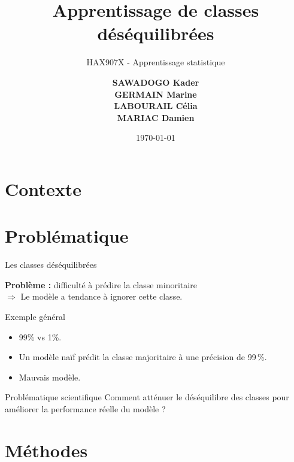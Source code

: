 \documentclass{beamer}
\title[Apprentissage de classes déséquilibrées]{\textbf{Apprentissage de classes déséquilibrées}}
\subtitle{\LARGE HAX907X - Apprentissage statistique}
\author[]{\textbf{SAWADOGO Kader \\ GERMAIN Marine \\ LABOURAIL Célia \\ MARIAC Damien}}
\institute[Université Montpellier]{Université Montpellier \\ Département de Mathématique}
\date{\today}
\begin{document}
\begin{frame}
  \titlepage
\end{frame}
\section{Contexte}

\section{Problématique}

\begin{frame}{Les classes déséquilibrées}

    \textbf{Problème :} difficulté à prédire la classe minoritaire \\[0.3cm]
    $\Rightarrow$ Le modèle a tendance à ignorer cette classe. \\[0.5cm]

    \begin{block}{Exemple général}
        \begin{itemize}
            \item 99\% vs 1\%.
            \item Un modèle naïf prédit la classe majoritaire à une précision de 99\,\%.
            \item Mauvais modèle.
        \end{itemize}
    \end{block}

\end{frame}


\begin{frame}{Problématique scientifique}
    \centering
    \Large{Comment atténuer le déséquilibre des classes pour améliorer la performance réelle du modèle ?}
\end{frame}


\section{Méthodes}
\end{document}
